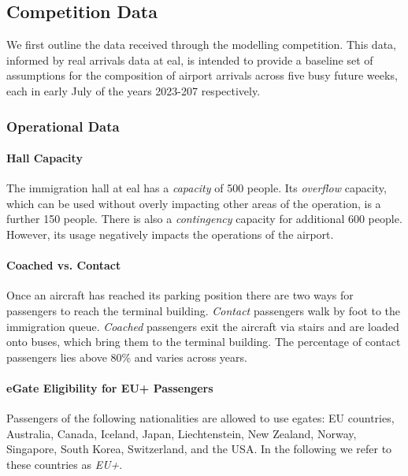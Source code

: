 \documentclass[10pt]{article}
\begin{document}
\subsection{Competition Data}

We first outline the data received through the modelling competition. This data, informed by real arrivals data at \gls{eal}, is intended to provide a baseline set of assumptions for the composition of airport arrivals across five busy future weeks, each in early July of the years 2023-207 respectively.

\subsubsection{Operational Data}

\paragraph{Hall Capacity}
The immigration hall at \gls{eal} has a \textit{capacity} of 500 people. Its \textit{overflow} capacity, which can be used without overly impacting other areas of the operation, is a further 150 people. There is also a \textit{contingency} capacity for additional 600 people. However, its usage negatively impacts the operations of the airport.

\paragraph{Coached vs. Contact}
Once an aircraft has reached its parking position there are two ways for passengers to reach the terminal building. \textit{Contact} passengers walk by foot to the immigration queue. \textit{Coached} passengers exit the aircraft via stairs and are loaded onto buses, which bring them to the terminal building. The percentage of contact passengers lies above 80\% and varies across years.

\paragraph{eGate Eligibility for EU+ Passengers}
Passengers of the following nationalities are allowed to use \glspl{egate}: EU countries, Australia, Canada, Iceland, Japan, Liechtenstein, New Zealand, Norway, Singapore, South Korea, Switzerland, and the USA. In the following we refer to these countries as \textit{EU+}. 
\end{document}
